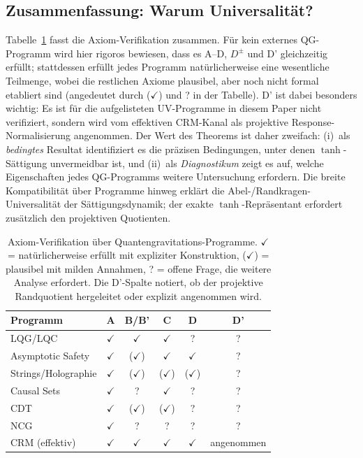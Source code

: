 \documentclass[aps,prd,twocolumn,superscriptaddress,nofootinbib]{revtex4-2}
\begin{document}
\subsection{Zusammenfassung: Warum Universalität?}

Tabelle~\ref{tab:axiom_check} fasst die Axiom-Verifikation zusammen. Für kein externes QG-Programm wird hier rigoros bewiesen, dass es A--D, $D^\pm$ und D' gleichzeitig erfüllt; stattdessen erfüllt jedes Programm natürlicherweise eine wesentliche Teilmenge, wobei die restlichen Axiome plausibel, aber noch nicht formal etabliert sind (angedeutet durch ($\checkmark$) und ? in der Tabelle). D' ist dabei besonders wichtig: Es ist für die aufgelisteten UV-Programme in diesem Paper nicht verifiziert, sondern wird vom effektiven CRM-Kanal als projektive Response-Normalisierung angenommen. Der Wert des Theorems ist daher zweifach: (i)~als \textit{bedingtes} Resultat identifiziert es die präzisen Bedingungen, unter denen $\tanh$-Sättigung unvermeidbar ist, und (ii)~als \textit{Diagnostikum} zeigt es auf, welche Eigenschaften jedes QG-Programms weitere Untersuchung erfordern. Die breite Kompatibilität über Programme hinweg erklärt die Abel-/Randkragen-Universalität der Sättigungsdynamik; der exakte $\tanh$-Repräsentant erfordert zusätzlich den projektiven Quotienten.

\begin{table}[h]
\caption{Axiom-Verifikation über Quantengravitations-Programme. $\checkmark$ = natürlicherweise erfüllt mit expliziter Konstruktion, ($\checkmark$) = plausibel mit milden Annahmen, ? = offene Frage, die weitere Analyse erfordert. Die D'-Spalte notiert, ob der projektive Randquotient hergeleitet oder explizit angenommen wird.}
\label{tab:axiom_check}
\begin{ruledtabular}
\begin{tabular}{lccccc}
Programm & A & B/B' & C & D & D' \\
\hline
LQG/LQC & $\checkmark$ & $\checkmark$ & $\checkmark$ & ? & ? \\
Asymptotic Safety & $\checkmark$ & ($\checkmark$) & $\checkmark$ & $\checkmark$ & ? \\
Strings/Holographie & $\checkmark$ & ($\checkmark$) & ($\checkmark$) & ($\checkmark$) & ? \\
Causal Sets & $\checkmark$ & ? & $\checkmark$ & ? & ? \\
CDT & $\checkmark$ & ($\checkmark$) & ($\checkmark$) & ? & ? \\
NCG & $\checkmark$ & ? & ? & ? & ? \\
CRM (effektiv) & $\checkmark$ & $\checkmark$ & $\checkmark$ & $\checkmark$ & angenommen \\
\end{tabular}
\end{ruledtabular}
\end{table}
\end{document}
